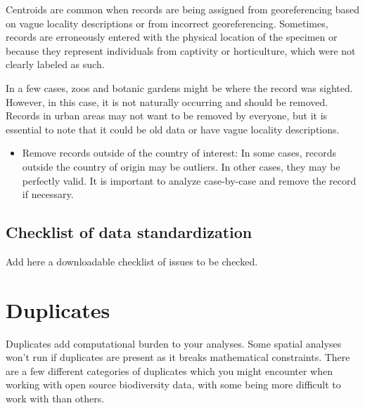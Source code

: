 \documentclass[
  letterpaper,
  DIV=11,
  numbers=noendperiod,
  oneside]{scrreprt}
\providecommand{\tightlist}{%
  \setlength{\itemsep}{0pt}\setlength{\parskip}{0pt}}\usepackage{longtable,booktabs,array}
\begin{document}
\begin{itemize}
  Centroids are common when records are being assigned from
  georeferencing based on vague locality descriptions or from incorrect
  georeferencing. Sometimes, records are erroneously entered with the
  physical location of the specimen or because they represent
  individuals from captivity or horticulture, which were not clearly
  labeled as such.

  In a few cases, zoos and botanic gardens might be where the record was
  sighted. However, in this case, it is not naturally occurring and
  should be removed. Records in urban areas may not want to be removed
  by everyone, but it is essential to note that it could be old data or
  have vague locality descriptions.
\end{itemize}

\begin{itemize}
\tightlist
\item
  Remove records outside of the country of interest: In some cases,
  records outside the country of origin may be outliers. In other cases,
  they may be perfectly valid. It is important to analyze case-by-case
  and remove the record if necessary.
\end{itemize}

\hypertarget{checklist-of-data-standardization}{%
\section{Checklist of data
standardization}\label{checklist-of-data-standardization}}

Add here a downloadable checklist of issues to be checked.


\hypertarget{duplicates}{%
\chapter{Duplicates}\label{duplicates}}

Duplicates add computational burden to your analyses. Some spatial
analyses won't run if duplicates are present as it breaks mathematical
constraints. There are a few different categories of duplicates which
you might encounter when working with open source biodiversity data,
with some being more difficult to work with than others.
\end{document}
